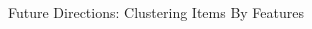 \documentclass[final,t]{beamer}
\begin{document}
\begin{frame}{}
\begin{columns}[t]
\begin{column}{.64\linewidth}
\begin{block}{Future Directions: Clustering Items By Features}


\end{block}
\end{column}
\end{columns}
\end{frame}
\end{document}
